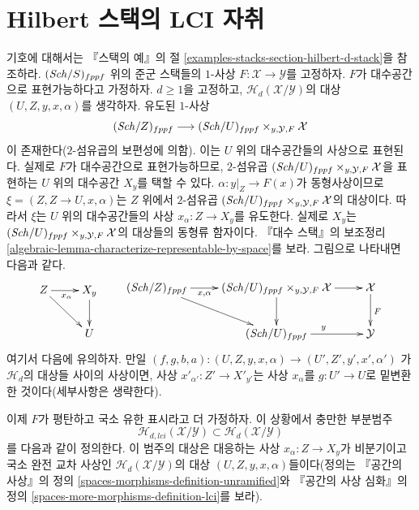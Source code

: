 \section{Hilbert 스택의 LCI 자취}
\label{section-lci}

\noindent
기호에 대해서는 『스택의 예』의 절
\ref{examples-stacks-section-hilbert-d-stack}을 참조하라.
$(\mathit{Sch}/S)_{fppf}$ 위의 준군 스택들의 $1$-사상
$F : \mathcal{X} \longrightarrow \mathcal{Y}$를 고정하자.
$F$가 대수공간으로 표현가능하다고 가정하자. $d \geq 1$을 고정하고,
$\mathcal{H}_d(\mathcal{X}/\mathcal{Y})$의 대상
$(U, Z, y, x, \alpha)$를 생각하자. 유도된 $1$-사상
$$
(\mathit{Sch}/Z)_{fppf}
\longrightarrow
(\mathit{Sch}/U)_{fppf} \times_{y, \mathcal{Y}, F} \mathcal{X}
$$
이 존재한다($2$-섬유곱의 보편성에 의함). 이는 $U$ 위의
대수공간들의 사상으로 표현된다. 실제로 $F$가 대수공간으로
표현가능하므로, $2$-섬유곱
$(\mathit{Sch}/U)_{fppf} \times_{y, \mathcal{Y}, F} \mathcal{X}$을 표현하는
$U$ 위의 대수공간 $X_y$를 택할 수 있다.
$\alpha : y|_Z \to F(x)$가 동형사상이므로
$\xi = (Z, Z \to U, x, \alpha)$는 $Z$ 위에서 $2$-섬유곱
$(\mathit{Sch}/U)_{fppf} \times_{y, \mathcal{Y}, F} \mathcal{X}$의 대상이다.
따라서 $\xi$는 $U$ 위의 대수공간들의 사상
$x_\alpha : Z \to X_y$를 유도한다. 실제로 $X_y$는
$(\mathit{Sch}/U)_{fppf} \times_{y, \mathcal{Y}, F} \mathcal{X}$의 대상들의
동형류 함자이다. 『대수 스택』의 보조정리
\ref{algebraic-lemma-characterize-representable-by-space}를 보라.
그림으로 나타내면 다음과 같다.
\begin{equation}
\label{equation-relative-map}
\vcenter{
\xymatrix{
Z \ar[r]_{x_\alpha} \ar[rd] & X_y \ar[d] \\
& U
}
}
\quad\quad
\vcenter{
\xymatrix{
(\Sch/Z)_{fppf} \ar[rd] \ar[r]_-{x, \alpha} &
(\Sch/U)_{fppf} \times_{y, \mathcal{Y}, F} \mathcal{X} \ar[r] \ar[d] &
\mathcal{X} \ar[d]^F \\
& (\Sch/U)_{fppf} \ar[r]^y & \mathcal{Y}
}
}
\end{equation}
여기서 다음에 유의하자. 만일
$(f, g, b, a) : (U, Z, y, x, \alpha) \to (U', Z', y', x', \alpha')$
가 $\mathcal{H}_d$의 대상들 사이의 사상이면, 사상
$x'_{\alpha'} : Z' \to X'_{y'}$는 사상 $x_\alpha$를
$g : U' \to U$로 밑변환한 것이다(세부사항은 생략한다).

\medskip\noindent
이제 $F$가 평탄하고 국소 유한 표시라고 더 가정하자. 이 상황에서
충만한 부분범주
$$
\mathcal{H}_{d, lci}(\mathcal{X}/\mathcal{Y}) \subset
\mathcal{H}_d(\mathcal{X}/\mathcal{Y})
$$
를 다음과 같이 정의한다. 이 범주의 대상은 대응하는 사상
$x_\alpha : Z \to X_y$가 비분기이고 국소 완전 교차 사상인
$\mathcal{H}_d(\mathcal{X}/\mathcal{Y})$의 대상
$(U, Z, y, x, \alpha)$들이다(정의는 『공간의 사상』의 정의
\ref{spaces-morphisms-definition-unramified}와 『공간의 사상 심화』의
정의 \ref{spaces-more-morphisms-definition-lci}를 보라).

